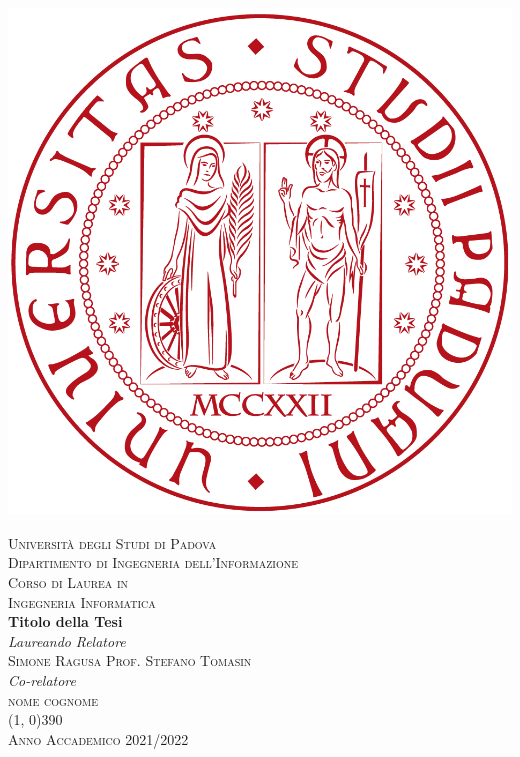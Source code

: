 



\frontmatter

\begin{titlepage}
    \begin{center}
        \includegraphics[scale=0.1]{images/unipd-red.png}

        \vspace{0.8cm}
        \textsc{\LARGE Università degli Studi di Padova}\\
        \vspace{0.45cm}
        \textsc{\large Dipartimento di Ingegneria dell'Informazione}\\
        \vspace{0.4cm}
        \textsc{\large Corso di Laurea in}\\
        \textsc{\large Ingegneria Informatica}\\

        \vfill
        {\LARGE \bfseries Titolo della Tesi}\\

        \vfill
        \textit{\large Laureando}
        \hfill
        \textit{\large Relatore}\\
        \textsc{\large Simone Ragusa}
        \hfill
        \textsc{\large Prof. Stefano Tomasin}\\

        \vspace{0.4cm}
        \hfill
        \textit{\large Co-relatore}\\
        \hfill
        \textsc{\large nome cognome}\\

        \vfill
        \line(1, 0){390}\\
        \textsc{Anno Accademico 2021/2022}
    \end{center}
\end{titlepage}

